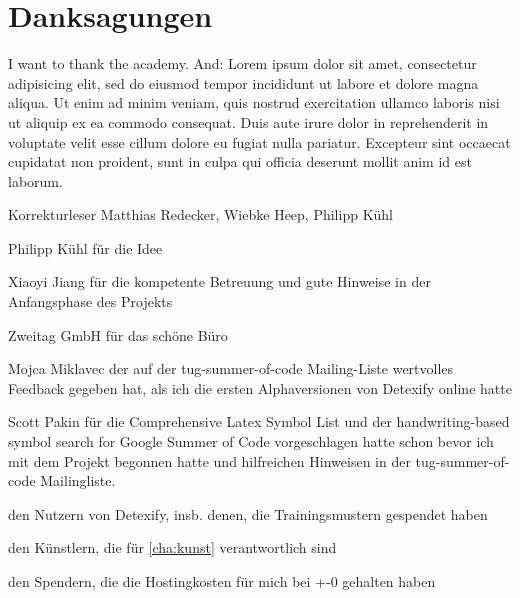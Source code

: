 \chapter{Danksagungen}

I want to thank the academy. And: Lorem ipsum dolor sit amet, consectetur adipisicing elit, sed do eiusmod tempor incididunt ut labore et dolore magna aliqua. Ut enim ad minim veniam, quis nostrud exercitation ullamco laboris nisi ut aliquip ex ea commodo consequat. Duis aute irure dolor in reprehenderit in voluptate velit esse cillum dolore eu fugiat nulla pariatur. Excepteur sint occaecat cupidatat non proident, sunt in culpa qui officia deserunt mollit anim id est laborum.

Korrekturleser Matthias Redecker, Wiebke Heep, Philipp Kühl

Philipp Kühl für die Idee

Xiaoyi Jiang für die kompetente Betreuung und gute Hinweise in der Anfangsphase des Projekts

Zweitag GmbH für das schöne Büro

Mojca Miklavec der auf der tug-summer-of-code Mailing-Liste wertvolles Feedback gegeben hat, als ich die ersten Alphaversionen von Detexify online hatte

Scott Pakin für die Comprehensive Latex Symbol List und der handwriting-based symbol search for Google Summer of Code vorgeschlagen hatte schon bevor ich mit dem Projekt begonnen hatte und hilfreichen Hinweisen in der tug-summer-of-code Mailingliste.

den Nutzern von Detexify, insb. denen, die Trainingsmustern gespendet haben

den Künstlern, die für \ref{cha:kunst} verantwortlich sind

den Spendern, die die Hostingkosten für mich bei +-0 gehalten haben